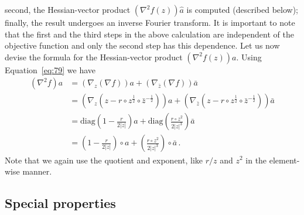 second, the Hessian-vector product $(\nabla^{2}f(z))\hat{a}$ is
computed (described below); finally, the result undergoes an inverse
Fourier transform. It is important to note that the first and the
third steps in the above calculation are independent of the objective
function and only the second step has this dependence. Let us now
devise the formula for the Hessian-vector product
$(\nabla^{2}f(z))a$. Using Equation~\eqref{eq:79} we have
\begin{equation}
  \label{eq:81}
  \begin{split}
   \left(
    \nabla^{2}f
  \right) a
  & =
  \left(
    \nabla_{z}(\nabla f)
  \right)  a +
  \left(
    \nabla_{\bar z}(\nabla f)
  \right)  \bar a \\
  & = \left(\nabla_{z} \left(
      z -  r\circ z^\frac{1}{2} \circ \bar{z}^{-\frac{1}{2}}
    \right)\right) a
  +  \left(\nabla_{\bar z} \left(
      z -  r\circ z^\frac{1}{2} \circ \bar{z}^{-\frac{1}{2}}
    \right)\right) \bar a \\
  & = \mathrm{diag}
  \left(
    1 - \frac{r}{2|z|}
  \right) a
  +
  \mathrm{diag}
  \left(
    \frac{r\circ z^{2}}{2|z|^{3}} 
  \right) \bar a \\
  & = \left(
    1 - \frac{r}{2|z|}
  \right)\circ a
  +
  \left(
    \frac{r\circ z^{2}}{2|z|^{3}} 
  \right) \circ \bar a\,.
  \end{split}
\end{equation}
Note that we again use the quotient and exponent, like $r/z$ and
$z^{2}$ in the element-wise manner.

\subsection{Special properties}
\label{sec:special-properties}

